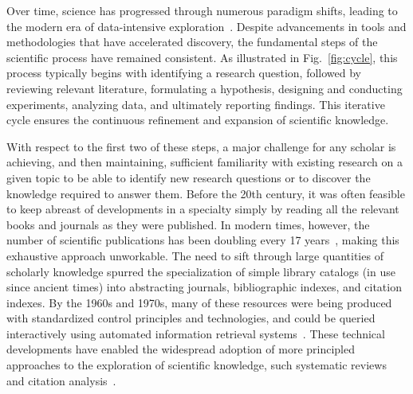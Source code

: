  Over time, science has progressed through numerous paradigm shifts, leading to the modern era of data-intensive exploration~\cite{hey2009jim}. Despite advancements in tools and methodologies that have accelerated discovery, the fundamental steps of the scientific process have remained consistent. As illustrated in Fig.~\ref{fig:cycle}, this process typically begins with identifying a research question, followed by reviewing relevant literature, formulating a hypothesis, designing and conducting experiments, analyzing data, and ultimately reporting findings. This iterative cycle ensures the continuous refinement and expansion of scientific knowledge.
 

With respect to the first two of these steps, a major challenge for any scholar is achieving, and then maintaining, sufficient familiarity with existing research on a given topic to be able to identify new research questions or to discover the knowledge required to answer them.  Before the 20th century, it was often feasible to keep abreast of developments in a specialty simply by reading all the relevant books and journals as they were published.  In modern times, however, the number of scientific publications has been doubling every 17 years~\cite{bornmann2021growth}, making this exhaustive approach unworkable.  The need to sift through large quantities of scholarly knowledge spurred the specialization of simple library catalogs (in use since ancient times) into abstracting journals, bibliographic indexes, and citation indexes.  By the 1960s and 1970s, many of these resources were being produced with standardized control principles and technologies, and could be queried interactively using automated information retrieval systems~\cite[pp.\,88--91]{borgman2007scholarship}.  These technical developments have enabled the widespread adoption of more principled approaches to the exploration of scientific knowledge, such systematic reviews~\cite{chalmers2002brief} and citation analysis~\cite{garfield1955citation}.

